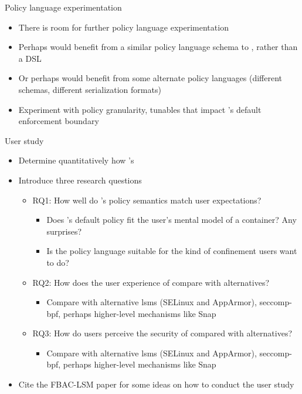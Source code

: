 \begin{inprogress}
  Policy language experimentation
  \begin{itemize}
    \item There is room for further policy language experimentation
    \item Perhaps \bpfbox{} would benefit from a similar policy language schema to \bpfcontain{}, rather than a DSL
    \item Or perhaps \bpfcontain{} would benefit from some alternate policy languages (different schemas, different serialization formats)
    \item Experiment with policy granularity, tunables that impact \bpfcontain{}'s default enforcement boundary
  \end{itemize}

  User study
  \begin{itemize}
    \item Determine quantitatively how \bpfcontain{}'s
    \item Introduce three research questions
    \begin{itemize}
      \item RQ1: How well do \bpfcontain{}'s policy semantics match user expectations?
      \begin{itemize}
        \item Does \bpfcontain{}'s default policy fit the user's mental model of a container? Any surprises?
        \item Is the \bpfcontain{} policy language suitable for the kind of confinement users want to do?
      \end{itemize}
      \item RQ2: How does the user experience of \bpfcontain{} compare with alternatives?
      \begin{itemize}
        \item Compare with alternative \glspl{lsm} (SELinux and AppArmor), seccomp-bpf, perhaps higher-level mechanisms like Snap
      \end{itemize}
      \item RQ3: How do users perceive the security of \bpfcontain{} compared with alternatives?
      \begin{itemize}
        \item Compare with alternative \glspl{lsm} (SELinux and AppArmor), seccomp-bpf, perhaps higher-level mechanisms like Snap
      \end{itemize}
    \end{itemize}
    \item Cite the FBAC-LSM paper for some ideas on how to conduct the user study
  \end{itemize}


\end{inprogress}
